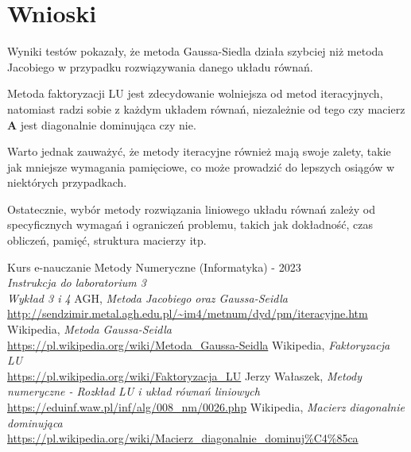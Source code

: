 \documentclass{article}
\begin{document}
\section{Wnioski}

Wyniki testów pokazały, że metoda Gaussa-Siedla 
działa szybciej niż metoda Jacobiego w 
przypadku rozwiązywania danego układu równań.

Metoda faktoryzacji LU jest zdecydowanie wolniejsza od metod iteracyjnych,
natomiast radzi sobie z każdym układem równań, niezależnie od tego czy
macierz $\boldsymbol{A}$ jest diagonalnie dominująca czy nie.

Warto jednak zauważyć, że metody iteracyjne również mają swoje zalety, 
takie jak mniejsze wymagania pamięciowe, co może prowadzić do lepszych 
osiągów w niektórych przypadkach.

Ostatecznie, wybór metody rozwiązania liniowego układu równań zależy 
od specyficznych wymagań i ograniczeń problemu, takich jak dokładność, 
czas obliczeń, pamięć, struktura macierzy itp.

\renewcommand{\refname}{Źródła}
\begin{thebibliography}{100}
    Kurs e-nauczanie Metody Numeryczne (Informatyka) - 2023\\
    \textit{Instrukcja do laboratorium 3}\\
    \textit{Wykład 3 i 4}
    AGH,
    \textit{Metoda Jacobiego oraz Gaussa-Seidla}
    \\\url{http://sendzimir.metal.agh.edu.pl/~im4/metnum/dyd/pm/iteracyjne.htm}
    Wikipedia,
    \textit{Metoda Gaussa-Seidla}
    \\\url{https://pl.wikipedia.org/wiki/Metoda_Gaussa-Seidla}
    Wikipedia,
    \textit{Faktoryzacja LU}
    \\\url{https://pl.wikipedia.org/wiki/Faktoryzacja_LU}
    Jerzy Wałaszek,
    \textit{Metody numeryczne - Rozkład LU i układ równań liniowych}
    \\\url{https://eduinf.waw.pl/inf/alg/008_nm/0026.php}
    Wikipedia,
    \textit{Macierz diagonalnie dominująca}
    \\\url{https://pl.wikipedia.org/wiki/Macierz_diagonalnie_dominuj%C4%85ca}

\end{thebibliography}
\end{document}
